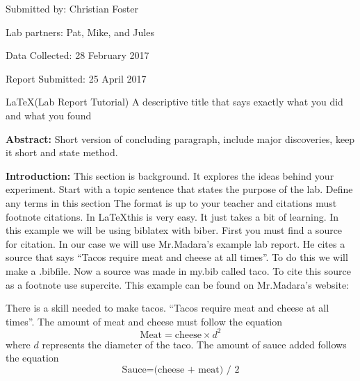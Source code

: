 \documentclass{report}
\begin{document}
 

\hfill Submitted by: Christian Foster 

\hfill Lab partners: Pat, Mike, and Jules 

\hfill Data Collected: 28 February 2017 

\hfill Report Submitted: 25 April 2017

\begin{center}
\fontsize{18pt}{12pt}\selectfont 
\LaTeX (Lab Report Tutorial) A descriptive title that says exactly what you did and what you found
\end{center}
\textbf{Abstract:} Short version of concluding paragraph, include major discoveries, keep it short and state method.
\begin{flushleft}
\textbf{Introduction:} This section is background. It explores the ideas behind your experiment. Start with a topic sentence that states the purpose of the lab. Define any terms in this section The format is up to your teacher and citations must footnote citations. In \LaTeX this is very easy. It just takes a bit of learning. In this example we will be using biblatex with biber. First you must find a source for citation. In our case we will use Mr.Madara's example lab report. He cites a source that says ``Tacos require meat and cheese at all times''. To do this we will make a .bibfile. Now a source was made in my.bib called taco. To cite this source as a footnote use supercite. This example can be found on Mr.Madara's website:\supercite{madara}
\end{flushleft}
	There is a skill needed to make tacos. ``Tacos require meat and cheese at all times''\supercite{taco}. 
	The amount of meat and cheese must follow the equation\supercite{taco}
\begin{equation}\label{meateq}
	\text{Meat} = \text{cheese} \times d^2
\end{equation}
where $d$ represents the diameter of the taco. The amount of sauce added  follows the equation\supercite{taco}
\begin{equation}\label{sauce}
	\text{Sauce} = \text{(cheese + meat) / 2}
\end{equation}
\end{document}
